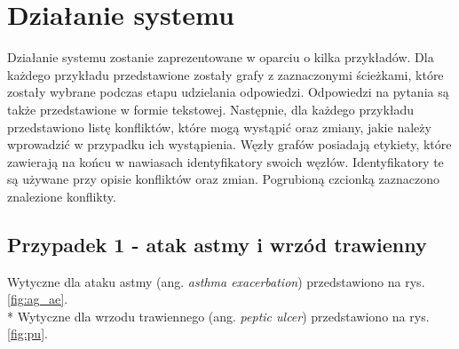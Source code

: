 \chapter{Działanie systemu}
Działanie systemu zostanie zaprezentowane w oparciu o kilka przykładów. Dla każdego przykładu przedstawione zostały grafy z zaznaczonymi ścieżkami, które zostały wybrane podczas etapu udzielania odpowiedzi. Odpowiedzi na pytania są także przedstawione w formie tekstowej. Następnie, dla każdego przykładu przedstawiono listę konfliktów, które mogą wystąpić oraz zmiany, jakie należy wprowadzić w przypadku ich wystąpienia. Węzły grafów posiadają etykiety, które zawierają na końcu w nawiasach identyfikatory swoich węzłów. Identyfikatory te są używane przy opisie konfliktów oraz zmian. Pogrubioną czcionką zaznaczono znalezione konflikty.


\section{Przypadek 1 - atak astmy i wrzód trawienny}
Wytyczne dla ataku astmy (ang. \textit{asthma exacerbation}) przedstawiono na rys. \ref{fig:ag_ae}.\\*
Wytyczne dla wrzodu trawiennego (ang. \textit{peptic ulcer}) przedstawiono na rys. \ref{fig:pu}.


